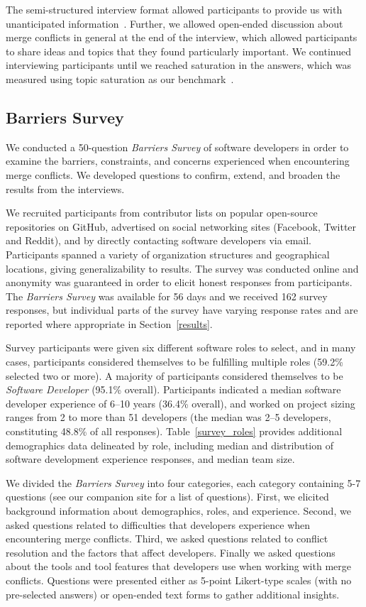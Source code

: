The semi-structured interview format allowed participants to provide us with unanticipated information~\cite{seaman2008qualitative}. 
Further, we allowed open-ended discussion about merge conflicts in general at the end of the interview, which allowed participants to share ideas and topics that they found particularly important. 
We continued interviewing participants until we reached saturation in the answers, which was measured using topic saturation as our benchmark~\cite{fusch2015we}.

\subsection{Barriers Survey}\label{perceptions_survey}

We conducted a 50-question \textit{Barriers Survey} of software developers in order to examine the barriers, constraints, and concerns experienced when encountering merge conflicts.
We developed questions to confirm, extend, and broaden the results from the interviews.

We recruited participants from contributor lists on popular open-source repositories on GitHub, advertised on social networking sites (Facebook, Twitter and Reddit), and by directly contacting software developers via email. 
Participants spanned a variety of organization structures and geographical locations, giving generalizability to results.
The survey was conducted online and anonymity was guaranteed in order to elicit honest responses from participants.
The \textit{Barriers Survey} was available for 56 days and we received 162 survey responses, but individual parts of the survey have varying response rates and are reported where appropriate in Section~\ref{results}.

Survey participants were given six different software roles to select, and in many cases, participants considered themselves to be fulfilling multiple roles (59.2\% selected two or more).
A majority of participants considered themselves to be \textit{Software Developer} (95.1\% overall).
Participants indicated a median software developer experience of 6--10 years (36.4\% overall), and worked on project sizing ranges from 2 to more than 51 developers (the median was 2--5 developers, constituting 48.8\% of all responses).
Table~\ref{survey_roles} provides additional demographics data delineated by role, including median and distribution of software development experience responses, and median team size.

We divided the \textit{Barriers Survey} into four categories, each category containing 5-7 questions (see our companion site for a list of questions).
First, we elicited background information about demographics, roles, and experience.
Second, we asked questions related to difficulties that developers experience when encountering merge conflicts.
Third, we asked questions related to conflict resolution and the factors that affect developers.
Finally we asked questions about the tools and tool features that developers use when working with merge conflicts.
Questions were presented either as 5-point Likert-type scales (with no pre-selected answers) or open-ended text forms to gather additional insights.

